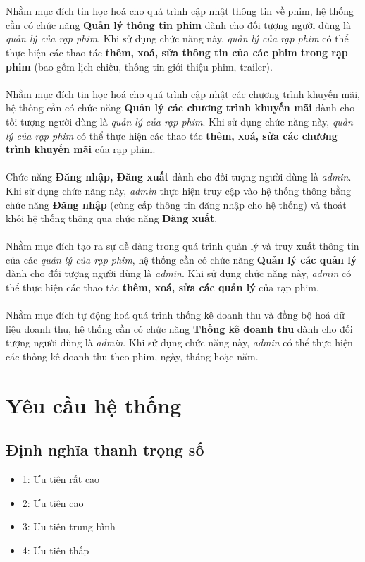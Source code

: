 \documentclass[a4paper, 12pt]{article}
\begin{document}
    \\\\
    Nhằm mục đích tin học hoá cho quá trình cập nhật thông tin về phim, hệ thống cần có chức năng \textbf{Quản lý thông tin phim} dành cho đối tượng người dùng là \textit{quản lý của rạp phim}. Khi sử dụng chức năng này, \textit{quản lý của rạp phim} có thể thực hiện các thao tác \textbf{thêm, xoá, sửa thông tin của các phim trong rạp phim} (bao gồm lịch chiếu, thông tin giới thiệu phim, trailer).
    \\\\
    Nhằm mục đích tin học hoá cho quá trình cập nhật các chương trình khuyến mãi, hệ thống cần có chức năng \textbf{Quản lý các chương trình khuyến mãi} dành cho tối tượng người dùng là \textit{quản lý của rạp phim}. Khi sử dụng chức năng này, \textit{quản lý của rạp phim} có thể thực hiện các thao tác \textbf{thêm, xoá, sửa các chương trình khuyến mãi} của rạp phim.
    \\\\
    Chức năng \textbf{Đăng nhập, Đăng xuất} dành cho đối tượng người dùng là \textit{admin}. Khi sử dụng chức năng này, \textit{admin} thực hiện truy cập vào hệ thống thông bằng chức năng \textbf{Đăng nhập} (cùng cấp thông tin đăng nhập cho hệ thống) và thoát khỏi hệ thống thông qua chức năng \textbf{Đăng xuất}.
    \\\\
    Nhằm mục đích tạo ra sự dễ dàng trong quá trình quản lý và truy xuất thông tin của các \textit{quản lý của rạp phim}, hệ thống cần có chức năng \textbf{Quản lý các quản lý} dành cho đối tượng người dùng là \textit{admin}. Khi sử dụng chức năng này, \textit{admin} có thể thực hiện các thao tác \textbf{thêm, xoá, sửa các quản lý} của rạp phim.
    \\\\
    Nhằm mục đích tự động hoá quá trình thống kê doanh thu và đồng bộ hoá dữ liệu doanh thu, hệ thống cần có chức năng \textbf{Thống kê doanh thu} dành cho đối tượng người dùng là \textit{admin}. Khi sử dụng chức năng này, \textit{admin} có thể thực hiện các thống kê doanh thu theo phim, ngày, tháng hoặc năm.
    \clearpage

    \section{Yêu cầu hệ thống}
    \label{sec:requirement}

    \subsection{Định nghĩa thanh trọng số}
    \begin{itemize}
        \item 1: Ưu tiên rất cao 
        \item 2: Ưu tiên cao 
        \item 3: Ưu tiên trung bình 
        \item 4: Ưu tiên thấp 
    \end{itemize}
\end{document}

